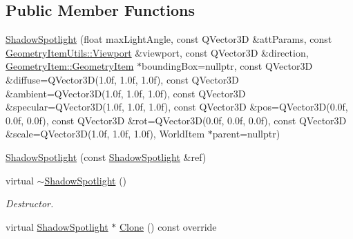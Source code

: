 \subsection*{Public Member Functions}
\begin{DoxyCompactItemize}
\item 
\mbox{\hyperlink{class_geometry_engine_1_1_geometry_world_item_1_1_geometry_light_1_1_shadow_spotlight_acd334b4a1d25cf529996f7960eb84312}{Shadow\+Spotlight}} (float max\+Light\+Angle, const Q\+Vector3D \&att\+Params, const \mbox{\hyperlink{class_geometry_engine_1_1_geometry_item_utils_1_1_viewport}{Geometry\+Item\+Utils\+::\+Viewport}} \&viewport, const Q\+Vector3D \&direction, \mbox{\hyperlink{class_geometry_engine_1_1_geometry_world_item_1_1_geometry_item_1_1_geometry_item}{Geometry\+Item\+::\+Geometry\+Item}} $\ast$bounding\+Box=nullptr, const Q\+Vector3D \&diffuse=Q\+Vector3D(1.\+0f, 1.\+0f, 1.\+0f), const Q\+Vector3\+D \&ambient=\+Q\+Vector3\+D(1.\+0f, 1.\+0f, 1.\+0f), const Q\+Vector3\+D \&specular=\+Q\+Vector3\+D(1.\+0f, 1.\+0f, 1.\+0f), const Q\+Vector3\+D \&pos=\+Q\+Vector3\+D(0.\+0f, 0.\+0f, 0.\+0f), const Q\+Vector3\+D \&rot=\+Q\+Vector3\+D(0.\+0f, 0.\+0f, 0.\+0f), const Q\+Vector3\+D \&scale=\+Q\+Vector3\+D(1.\+0f, 1.\+0f, 1.\+0f), World\+Item $\ast$parent=nullptr)
\item 
\mbox{\hyperlink{class_geometry_engine_1_1_geometry_world_item_1_1_geometry_light_1_1_shadow_spotlight_a8757a401616b581827158f64eb176964}{Shadow\+Spotlight}} (const \mbox{\hyperlink{class_geometry_engine_1_1_geometry_world_item_1_1_geometry_light_1_1_shadow_spotlight}{Shadow\+Spotlight}} \&ref)
\item 
\mbox{\label{class_geometry_engine_1_1_geometry_world_item_1_1_geometry_light_1_1_shadow_spotlight_a1f4f0d06e4d09e72486844832122c01a}} 
virtual \mbox{\hyperlink{class_geometry_engine_1_1_geometry_world_item_1_1_geometry_light_1_1_shadow_spotlight_a1f4f0d06e4d09e72486844832122c01a}{$\sim$\+Shadow\+Spotlight}} ()
\begin{DoxyCompactList}\small\item\em Destructor. \end{DoxyCompactList}\item 
virtual \mbox{\hyperlink{class_geometry_engine_1_1_geometry_world_item_1_1_geometry_light_1_1_shadow_spotlight}{Shadow\+Spotlight}} $\ast$ \mbox{\hyperlink{class_geometry_engine_1_1_geometry_world_item_1_1_geometry_light_1_1_shadow_spotlight_a0ea8fd05d26f6e780d352168c28f940d}{Clone}} () const override
\end{DoxyCompactItemize}

